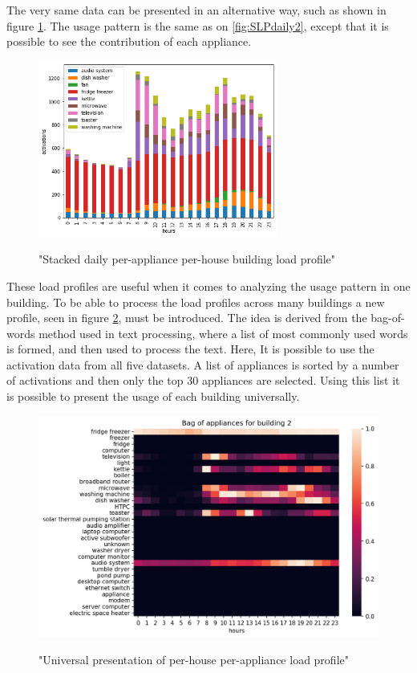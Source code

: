 The very same data can be presented in an alternative way, such as shown in figure \ref{fig:stack}.
The usage pattern is the same as on \ref{fig:SLPdaily2}, except that it is possible to see
the contribution of each appliance. 

\begin{figure}[H]
	\centering
	\caption{"Stacked daily per-appliance per-house building load profile"}
	\includegraphics[width=0.7\textwidth]{../Figures/LPS/stack.png}
	\label{fig:stack}
\end{figure}

These load profiles are useful when it comes to analyzing the usage pattern in one building.
To be able to process the load profiles across many buildings a new profile, seen in figure \ref{fig:BOA}, must be introduced.
The idea is derived from the bag-of-words method used in text processing, where a list of most commonly used words is formed, and then used to process the text. 
Here, It is possible to use the activation data from all five datasets.
A list of appliances is sorted by a number of activations and then only the top 30 appliances are selected.
Using this list it is possible to present the usage of each building universally.

\begin{figure}[H]
	\centering
	\caption{"Universal presentation of per-house per-appliance load profile"}
	\includegraphics[width=1\textwidth]{../Figures/LPS/BOA.png}
	\label{fig:BOA}
\end{figure}

